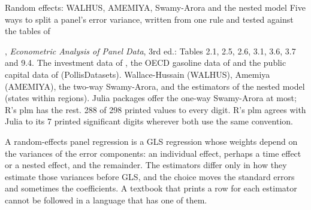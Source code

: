 



  {Random effects: WALHUS, AMEMIYA, Swamy-Arora and the nested model}
  {Five ways to split a panel's error variance, written from one rule and tested against the tables of }

\factsheet
  {, \emph{Econometric Analysis of Panel Data}, 3rd ed.: Tables 2.1, 2.5, 2.6, 3.1, 3.6, 3.7 and 9.4.
   The investment data of , the OECD gasoline data of  and the public capital data of  (PollisDatasets).}
  {Wallace-Hussain (WALHUS), Amemiya (AMEMIYA), the two-way Swamy-Arora, and the estimators of the nested model
   (states within regions). Julia packages offer the one-way Swamy-Arora at most; R's plm has the rest.}
  {}
  {288 of 298 printed values to every digit. R's plm agrees with Julia to its 7 printed significant digits wherever
   both use the same convention.}

A random-effects panel regression is a GLS regression whose weights depend on the variances of the error components:
an individual effect, perhaps a time effect or a nested effect, and the remainder. The estimators differ only in how they
estimate those variances before GLS, and the choice moves the standard errors and sometimes the coefficients. A textbook
that prints a row for each estimator cannot be followed in a language that has one of them.

